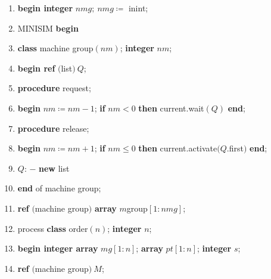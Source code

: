 \documentclass[twoside,11pt,fontset=none]{ctexbook}
\begin{document}
\begin{enumerate}[nosep, label=\arabic*.]
	\label{pg:program-job-shop}
	
	\item \label{pg:program-job-shop-1}
	\textbf{begin integer} $nmg;\ nmg \coloneq$ inint;
	 
	\item MINISIM \textbf{begin}
	
	\item \label{pg:program-job-shop-3}
	\textbf{class} machine group$(nm)$; \textbf{integer} $nm$;
	
	\item \label{pg:program-job-shop-4}
	\textbf{begin ref} $($list$)\ Q$;
	
	\item \label{pg:program-job-shop-5}
	\quad \textbf{procedure} request;
	
	\item \label{pg:program-job-shop-6}
	\quad \textbf{begin} $nm \coloneq nm - 1$; \textbf{if} $nm < 0$ \textbf{then} current.wait$(Q)$ \textbf{end};
	
	\item \label{pg:program-job-shop-7}
	\quad \textbf{procedure} release;
	
	\item \label{pg:program-job-shop-8}
	\quad \textbf{begin} $nm \coloneq nm + 1$; \textbf{if} $nm \leqslant 0$ \textbf{then} current.activate$(Q$.first$)$ \textbf{end};
	
	\item \label{pg:program-job-shop-9}
	\quad $Q$: $-$ \textbf{new} list
	
	\item \label{pg:program-job-shop-10}
	\textbf{end} of machine group;
	
	\item \label{pg:program-job-shop-11}
	\textbf{ref} $($machine group$)$ \textbf{array} $m$group$[1:nmg]$;
	
	\item \label{pg:program-job-shop-12}
	process \textbf{class} order$(n)$; \textbf{integer} $n$;
	
	\item \label{pg:program-job-shop-13}
	\textbf{begin integer array} $mg[1:n]$; \textbf{array} $pt[1:n]$; \textbf{integer} $s$;
	
	\item \label{pg:program-job-shop-14}
	\quad \textbf{ref} $($machine group$)\ M$;
	

\end{enumerate}
\end{document}
